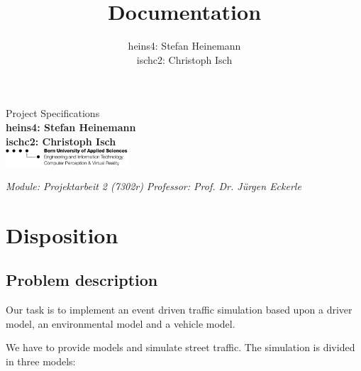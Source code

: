 \documentclass[a4paper,10pt,titlepage]{article}
\title{Documentation}
\author{heins4: Stefan Heinemann\\ischc2: Christoph Isch}
\begin{document}
\begin{titlepage}
{\huge Project Specifications}\\
\textbf{heins4: Stefan Heinemann}\\
\textbf{ischc2: Christoph Isch}\\
\newline\newline\newline\newline\newline
\newline\newline\newline\newline\newline\newline\newline\newline\newline
\newline\newline\newline\newline\newline\newline\newline\newline
\includegraphics[width=46mm]{logo_ti.png}\newline

\emph{Module: Projektarbeit 2 (7302r)}\newline
\emph{Professor: Prof. Dr. Jürgen Eckerle}

\end{titlepage}

\tableofcontents

\newpage

\section{Disposition}

\subsection{Problem description}
Our task is to implement an event driven traffic simulation based upon a driver model, an environmental model and a vehicle model.

We have to provide models and simulate street traffic. 
The simulation is divided in three models:
\end{document}
